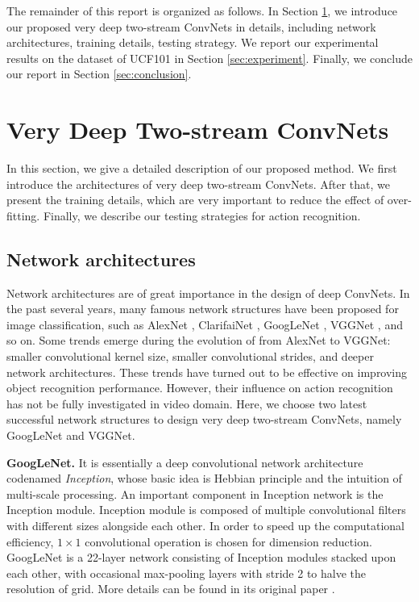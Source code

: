 \documentclass[10pt,twocolumn,letterpaper]{article}
\begin{document}
The remainder of this report is organized as follows. In Section \ref{sec:method}, we introduce our proposed very deep two-stream ConvNets in details, including network architectures, training details, testing strategy. We report our experimental results on the dataset of UCF101 in Section \ref{sec:experiment}. Finally, we conclude our report in Section \ref{sec:conclusion}.

\section{Very Deep Two-stream ConvNets}
\label{sec:method}

In this section, we give a detailed description of our proposed method. We first introduce the architectures of very deep two-stream ConvNets. After that, we present the training details, which are very important to reduce the effect of over-fitting. Finally, we describe our testing strategies for action recognition.

\subsection{Network architectures}
Network architectures are of great importance in the design of deep ConvNets. In the past several years, many famous network structures have been proposed for image classification, such as AlexNet \cite{KrizhevskySH12}, ClarifaiNet \cite{ZeilerF14}, GoogLeNet \cite{SzegedyLJSRAEVR14}, VGGNet \cite{SimonyanZ14a}, and so on. Some trends emerge during the evolution of from AlexNet to VGGNet: smaller convolutional kernel size, smaller convolutional strides, and deeper network architectures. These trends have turned out to be effective on improving object recognition performance. However, their influence on action recognition has not be fully investigated in video domain. Here, we choose two latest successful network structures to design very deep two-stream ConvNets, namely GoogLeNet and VGGNet.

\textbf{GoogLeNet.} It is essentially a deep convolutional network architecture codenamed \emph{Inception}, whose basic idea is Hebbian principle and the intuition of multi-scale processing. An important component in Inception network is the Inception module. Inception module is composed of multiple convolutional filters with different sizes alongside each other. In order to speed up the computational efficiency, $1 \times 1$ convolutional operation is chosen for dimension reduction. GoogLeNet is a 22-layer network consisting of Inception modules stacked upon each other, with occasional max-pooling layers with stride 2 to halve the resolution of grid. More details can be found in its original paper \cite{SzegedyLJSRAEVR14}.
\end{document}
